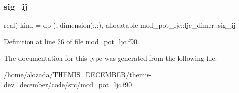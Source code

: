 \subsubsection{\texorpdfstring{sig\+\_\+ij}{sig\_ij}}
{\footnotesize\ttfamily real( kind = dp ), dimension(\+:,\+:), allocatable mod\+\_\+pot\+\_\+ljc\+::ljc\+\_\+dimer\+::sig\+\_\+ij}



Definition at line 36 of file mod\+\_\+pot\+\_\+ljc.\+f90.



The documentation for this type was generated from the following file\+:\begin{DoxyCompactItemize}
\item 
/home/alozada/\+T\+H\+E\+M\+I\+S\+\_\+\+D\+E\+C\+E\+M\+B\+E\+R/themis-\/dev\+\_\+december/code/src/\hyperlink{mod__pot__ljc_8f90}{mod\+\_\+pot\+\_\+ljc.\+f90}\end{DoxyCompactItemize}
